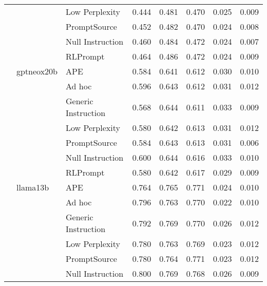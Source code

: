 \begin{supertabular}{lllrrrrr}
              &        & Low Perplexity &            0.444 &           0.481 &          0.470 &        0.025 &    0.009 \\
              &        & PromptSource &            0.452 &           0.482 &          0.470 &        0.024 &    0.008 \\
              &        & Null Instruction &            0.460 &           0.484 &          0.472 &        0.024 &    0.007 \\
              &        & RLPrompt &            0.464 &           0.486 &          0.472 &        0.024 &    0.009 \\
              & gptneox20b & APE &            0.584 &           0.641 &          0.612 &        0.030 &    0.010 \\
              &        & Ad hoc &            0.596 &           0.643 &          0.612 &        0.031 &    0.012 \\
              &        & Generic Instruction &            0.568 &           0.644 &          0.611 &        0.033 &    0.009 \\
              &        & Low Perplexity &            0.580 &           0.642 &          0.613 &        0.031 &    0.012 \\
              &        & PromptSource &            0.584 &           0.643 &          0.613 &        0.031 &    0.006 \\
              &        & Null Instruction &            0.600 &           0.644 &          0.616 &        0.033 &    0.010 \\
              &        & RLPrompt &            0.580 &           0.642 &          0.617 &        0.029 &    0.009 \\
              & llama13b & APE &            0.764 &           0.765 &          0.771 &        0.024 &    0.010 \\
              &        & Ad hoc &            0.796 &           0.763 &          0.770 &        0.022 &    0.010 \\
              &        & Generic Instruction &            0.792 &           0.769 &          0.770 &        0.026 &    0.012 \\
              &        & Low Perplexity &            0.780 &           0.763 &          0.769 &        0.023 &    0.012 \\
              &        & PromptSource &            0.780 &           0.764 &          0.771 &        0.023 &    0.012 \\
              &        & Null Instruction &            0.800 &           0.769 &          0.768 &        0.026 &    0.009 \\

\end{supertabular}
